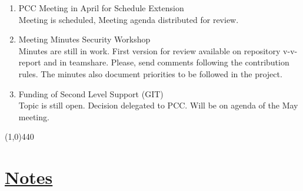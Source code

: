 \documentclass[a4paper]{article}
\begin{document}
\begin{enumerate}
\item PCC Meeting in April for Schedule Extension\\
Meeting is scheduled, Meeting agenda distributed for review.

\item Meeting Minutes Security Workshop\\
Minutes are still in work. First version for review available on repository v-v-report and in teamshare. Please, send comments following the contribution rules. The minutes also document priorities to be followed in the project.

\item Funding of Second Level Support (GIT)\\
Topic is still open. Decision delegated to PCC. Will be on agenda of the May meeting.
\end{enumerate}

\line(1,0){440}
\section*{\underline{Notes}}
\end{document}
